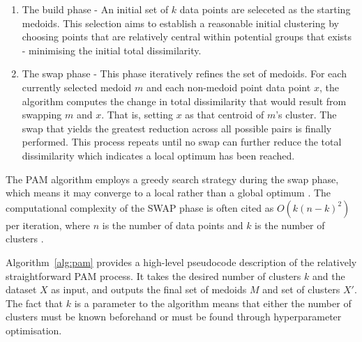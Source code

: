 \documentclass[10pt,oneside]{report}
\begin{document}
\begin{enumerate}
    \item The build phase - An initial set of $k$ data points are seleceted as the starting medoids. This selection aims to establish a reasonable initial clustering by choosing points that are relatively central within potential groups that exists - minimising the initial total dissimilarity.
    \item The swap phase - This phase iteratively refines the set of medoids. For each currently selected medoid $m$ and each non-medoid point data point $x$, the algorithm computes the change in total dissimilarity that would result from swapping $m$ and $x$. That is, setting $x$ as that centroid of $m$'s cluster. The swap that yields the greatest reduction across all possible pairs is finally performed. This process repeats until no swap can further reduce the total dissimilarity which indicates a local optimum has been reached.
\end{enumerate}

The PAM algorithm employs a greedy search strategy during the swap phase, which means it may converge to a local rather than a global optimum \cite{kmedoids}. The computational complexity of the SWAP phase is often cited as $O(k(n - k)^2)$ per iteration, where $n$ is the number of data points and $k$ is the number of clusters \cite{kmedoids}.

Algorithm~\ref{alg:pam} provides a high-level pseudocode description of the relatively straightforward PAM process. It takes the desired number of clusters $k$ and the dataset $X$ as input, and outputs the final set of medoids $M$ and set of clusters $X'$. The fact that $k$ is a parameter to the algorithm means that either the number of clusters must be known beforehand or must be found through hyperparameter optimisation.
\end{document}
